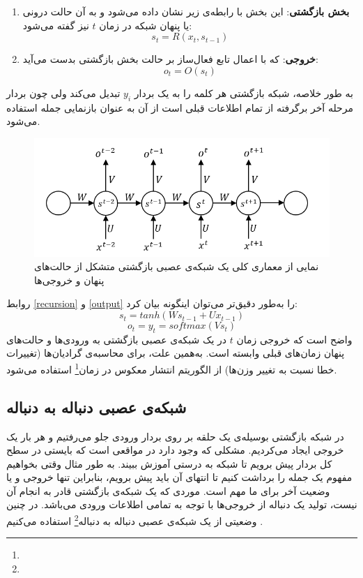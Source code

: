 \begin{enumerate}
	\item \textbf{بخش بازگشتی}:
	 این بخش با رابطه‌ی زیر نشان داده‌ می‌شود و به آن حالت درونی یا پنهان شبکه در زمان $t$ نیز گفته می‌شود:
	\begin{equation}
	\label{recursion}
		s_t = R(x_t, s_{t-1})
	\end{equation}
	\item \textbf{خروجی}:
	 که با اعمال تابع فعال‌ساز بر حالت بخش بازگشتی بدست می‌آید:
	\begin{equation}
	\label{output}
		o_t = O(s_t)
	\end{equation}
\end{enumerate}
به طور خلاصه، شبکه بازگشتی هر کلمه را به یک بردار $y_i$ تبدیل می‌کند ولی چون بردار مرحله آخر برگرفته از تمام اطلاعات قبلی است از آن به عنوان بازنمایی جمله استفاده می‌شود.
\begin{figure}[t!]
	\centering
	\includegraphics[scale=0.7]{figures/rnn.png}
	\caption[معماری کلی یک شبکه‌ی عصبی بازگشتی]{نمایی از معماری کلی یک شبکه‌ی عصبی بازگشتی متشکل از حالت‌های پنهان و خروجی‌ها}
	\label{fig:rnn}
\end{figure}

روابط \ref{recursion} و \ref{output} را به‌طور دقیق‌تر می‌توان اینگونه‌ بیان کرد:
\begin{equation}
s_t = tanh(Ws_{t-1} + Ux_{t-1})
\end{equation}
\begin{equation}
	o_t = y_t = softmax(Vs_t)
\end{equation}
واضح است که خروجی‌ زمان $t$ در یک شبکه‌ی عصبی بازگشتی به ورودی‌ها و حالت‌های پنهان زمان‌های قبلی وابسته است. به‌همین علت،‌ برای محاسبه‌ی گرادیان‌ها (تغییرات خطا نسبت به تغییر وزن‌ها) از الگوریتم انتشار معکوس در زمان\footnote{} استفاده می‌شود. 

\subsection{شبکه‌ی عصبی دنباله به دنباله}
در شبکه بازگشتی بوسیله‌ی یک حلقه بر روی بردار ورودی جلو می‌رفتیم و هر بار یک خروجی ایجاد می‌کردیم. مشکلی که وجود دارد در مواقعی است که بایستی در سطح کل بردار پیش برویم تا شبکه به درستی آموزش ببیند. به طور مثال وقتی بخواهیم مفهوم یک جمله را برداشت کنیم تا انتهای آن باید پیش برویم، بنابراین تنها خروجی و یا وضعیت آخر برای ما مهم است. موردی که یک شبکه‌ی بازگشتی قادر به انجام آن نیست، تولید یک دنباله‌ از خروجی‌ها با توجه به تمامی اطلاعات ورودی می‌باشد. در چنین وضعیتی از یک شبکه‌ی عصبی دنباله به دنباله\footnote{} استفاده می‌کنیم \cite{sutskever2014seq2seq}.
